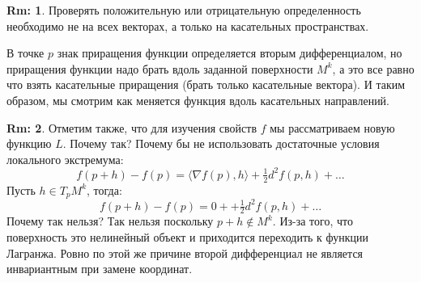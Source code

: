 \documentclass[12pt]{article}
\theoremstyle{definition}
\newtheorem{rem}{Rm:}
\begin{document}
\begin{rem}
	Проверять положительную или отрицательную определенность необходимо не на всех векторах, а только на касательных пространствах. 
	
	В точке $p$ знак приращения функции определяется вторым дифференциалом, но приращения функции надо брать вдоль заданной поверхности $M^k$, а это все равно что взять касательные приращения (брать только касательные вектора). И таким образом, мы смотрим как меняется функция вдоль касательных направлений.
\end{rem}
\begin{rem}
	Отметим также, что для изучения свойств $f$ мы рассматриваем новую функцию $L$. Почему так? Почему бы не использовать достаточные условия локального экстремума:
	$$
		f(p+h) - f(p) = \langle \nabla f(p), h\rangle + \tfrac{1}{2}d^2f(p,h) + \dotsc
	$$
	Пусть $h \in T_p M^k$, тогда:
	$$
		f(p + h) - f(p) = 0 + + \tfrac{1}{2}d^2f(p,h) + \dotsc
	$$
	Почему так нельзя? Так нельзя поскольку $p + h \notin M^k$. Из-за того, что поверхность это нелинейный объект и приходится переходить к функции Лагранжа. Ровно по этой же причине второй дифференциал не является инвариантным при замене координат.
\end{rem}
\end{document}
